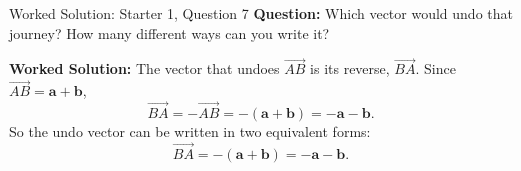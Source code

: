 \documentclass{beamer}
\begin{document}
\begin{frame}{Worked Solution: Starter 1, Question 7}
\textbf{Question:} Which vector would undo that journey? How many different ways can you write it?

\textbf{Worked Solution:}
The vector that undoes \(\overrightarrow{AB}\) is its reverse, \(\overrightarrow{BA}\). Since \(\overrightarrow{AB}=\mathbf{a}+\mathbf{b}\),
\[
\overrightarrow{BA}
=
-\overrightarrow{AB}
=
-(\mathbf{a}+\mathbf{b})
=
-\mathbf{a}-\mathbf{b}.
\]
So the undo vector can be written in two equivalent forms:
\[
\overrightarrow{BA}
=
-(\mathbf{a}+\mathbf{b})
=
-\mathbf{a}-\mathbf{b}.
\]

\end{frame}
\end{document}
